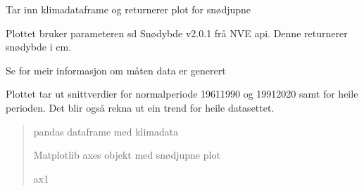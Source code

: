 \documentclass[letterpaper,10pt,norsk]{sphinxmanual}
\begin{document}
\begin{fulllineitems}
\label{\detokenize{index:klimadata.plot.snodjupne}}
\pysigstartsignatures
{}
\pysigstopsignatures
\sphinxAtStartPar
Tar inn klimadataframe og returnerer plot for snødjupne

\sphinxAtStartPar
Plottet bruker parameteren sd \sphinxhyphen{} Snødybde v2.0.1 frå NVE api.
Denne returnerer snødybde i cm.

\sphinxAtStartPar
Se  for meir informasjon om måten data er generert

\sphinxAtStartPar
Plottet tar ut snittverdier for normalperiode 1961\sphinxhyphen{}1990 og 1991\sphinxhyphen{}2020 samt for heile perioden.
Det blir også rekna ut ein trend for heile datasettet.
\begin{quote}\begin{description}
\sphinxAtStartPar
{} \textendash{} pandas dataframe med klimadata

\sphinxAtStartPar
Matplotlib axes objekt med snødjupne plot

\sphinxAtStartPar
ax1

\end{description}\end{quote}

\end{fulllineitems}

\end{document}
